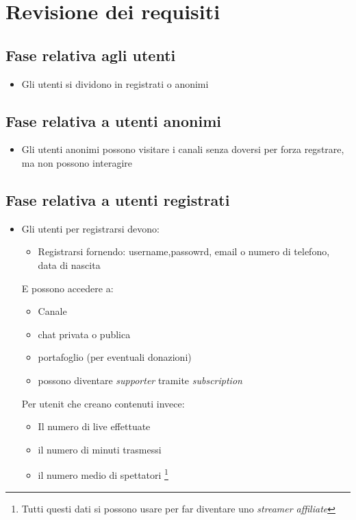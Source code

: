 \section{Revisione dei requisiti}

\subsection{Fase relativa agli utenti}
\begin{itemize}
  \item Gli utenti si dividono in registrati o anonimi
\end{itemize}
\subsection{Fase relativa a utenti anonimi}
\begin{itemize}
  \item Gli utenti anonimi possono visitare i canali senza doversi per 
  forza regstrare, ma non possono interagire 
\end{itemize}
\subsection{Fase relativa a utenti registrati}
\begin{itemize}
  \item Gli utenti per registrarsi devono:
  \begin{itemize}
    \item Registrarsi fornendo: username,passowrd, email o numero di telefono, data di nascita
  \end{itemize}
  E possono accedere a:
    \begin{itemize}
      \item Canale 
      \item chat privata o publica
      \item portafoglio (per eventuali donazioni)
      \item possono diventare \textit{supporter} tramite \textit{subscription}
    \end{itemize} 
  Per utenit che creano contenuti invece:
    \begin{itemize}
      \item Il numero di live effettuate 
      \item il numero di minuti trasmessi
      \item il numero medio di spettatori \footnote{Tutti questi dati si possono usare per far diventare uno \textit{streamer affiliate}} %
    \end{itemize}
\end{itemize}
